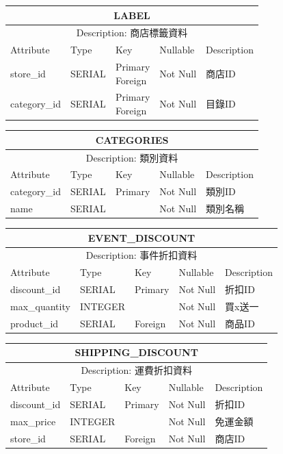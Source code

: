 \documentclass[a4paper, 12pt]{article}
\begin{document}
\noindent\begin{tabular}{ | p{7em} | p{5.5em} | p{5.5em} | p{4.5em} | p{11em} |}
  \hline
  \multicolumn{5}{|c|}{LABEL} \tabularnewline
  \hline 
  \multicolumn{5}{|c|}{Description: 商店標籤資料} \tabularnewline
  \hline 
  Attribute & Type & Key & Nullable & Description \\
  \hline
  store_id& SERIAL & \makecell[l]{Primary \\ Foreign}& Not Null & 商店ID \\
  \hline
  category_id & SERIAL & \makecell[l]{Primary \\ Foreign} &Not Null &目錄ID\\
  \hline
\end{tabular}
\vspace{1em}

\noindent\begin{tabular}{ | p{7em} | p{5.5em} | p{5.5em} | p{4.5em} | p{11em} |}
  \hline
  \multicolumn{5}{|c|}{CATEGORIES} \tabularnewline
  \hline 
  \multicolumn{5}{|c|}{Description: 類別資料} \tabularnewline
  \hline 
  Attribute & Type & Key & Nullable & Description \\
  \hline
  category_id& SERIAL & Primary & Not Null & 類別ID \\
  \hline
  name & SERIAL & &Not Null &類別名稱\\
  \hline
\end{tabular}

\vspace{1em}
\noindent\begin{tabular}{ | p{7em} | p{5.5em} | p{5.5em} | p{4.5em} | p{11em} |}
  \hline
  \multicolumn{5}{|c|}{EVENT_DISCOUNT} \tabularnewline
  \hline 
  \multicolumn{5}{|c|}{Description: 事件折扣資料} \tabularnewline
  \hline 
  Attribute & Type & Key & Nullable & Description \\
  \hline
  discount_id & SERIAL & Primary & Not Null & 折扣ID \\
  \hline
  max_quantity & INTEGER & &Not Null &買x送一\\
  \hline
  product_id & SERIAL & Foreign &Not Null &商品ID\\
  \hline
\end{tabular}
\vspace{1em}

\noindent\begin{tabular}{ | p{7em} | p{5.5em} | p{5.5em} | p{4.5em} | p{11em} |}
  \hline
  \multicolumn{5}{|c|}{SHIPPING_DISCOUNT} \tabularnewline
  \hline 
  \multicolumn{5}{|c|}{Description: 運費折扣資料} \tabularnewline
  \hline 
  Attribute & Type & Key & Nullable & Description \\
  \hline
  discount_id & SERIAL & Primary & Not Null & 折扣ID \\
  \hline
  max_price & INTEGER & &Not Null &免運金額\\
  \hline
  store_id & SERIAL & Foreign &Not Null &商店ID\\
  \hline
\end{tabular}
\vspace{1em}
\end{document}
